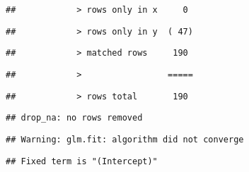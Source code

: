 \documentclass[
]{article}
\begin{document}
\begin{verbatim}
##            > rows only in x     0
\end{verbatim}

\begin{verbatim}
##            > rows only in y  ( 47)
\end{verbatim}

\begin{verbatim}
##            > matched rows     190
\end{verbatim}

\begin{verbatim}
##            >                 =====
\end{verbatim}

\begin{verbatim}
##            > rows total       190
\end{verbatim}

\begin{verbatim}
## drop_na: no rows removed
\end{verbatim}

\begin{verbatim}
## Warning: glm.fit: algorithm did not converge
\end{verbatim}

\begin{verbatim}
## Fixed term is "(Intercept)"
\end{verbatim}
\end{document}
